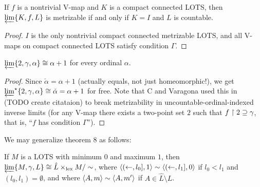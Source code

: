 \documentclass[11pt]{article}
\newcommand{\lexTimes}{\times_{\textrm{lex}}}
\begin{document}
  \begin{corollary}
    If \(f\) is a nontrivial V-map
    and \(K\) is a compact connected LOTS, then
    \(\varprojlim \{K, f, L\}\) is metrizable if and only if
    \(K=I\) and \(L\) is countable.
  \end{corollary}

  \begin{proof}
    \(I\) is the only nontrivial compact connected metrizable LOTS, and all V-maps
    on compact connected LOTS satisfy condition \(\Gamma\).
  \end{proof}

  \begin{corollary}
    \(
      \varprojlim \{2, \gamma, \alpha\}
      \cong
      \alpha+1
    \)
    for every ordinal \(\alpha\).
  \end{corollary}

  \begin{proof}
    Since \(\check\alpha=\alpha+1\) (actually equals, not just homeomorphic!),
    we get \(\varprojlim^\star \{2, \gamma, \alpha\}
      \cong \check\alpha =
    \alpha+1\) for free.
    Note that C and Varagona used this in (TODO create citataion) to break
    metrizability in uncountable-ordinal-indexed inverse limits (for any V-map
    there exists a two-point set \(2\) such that \(f\restriction 2\supseteq\gamma\),
    that is, ``\(f\) has condition \(\Gamma\)'').
  \end{proof}

  \bigskip

  We may generalize theorem 8 as follows:

  \begin{theorem}
    If \(M\) is a LOTS with minimum \(0\) and maximum \(1\),
    then \(\varprojlim\{M,\gamma,L\}\cong \hat L\lexTimes M/\sim\),
    where \(\langle(\leftarrow,l_0],1\rangle\sim\langle(\leftarrow,l_1],0\rangle\) if
    \(l_0<l_1\) and \((l_0,l_1)=\emptyset\),
    and where \(\langle A,m\rangle\sim\langle A,m'\rangle\) if \(A\in\hat L\setminus L\).
  \end{theorem}
\end{document}
